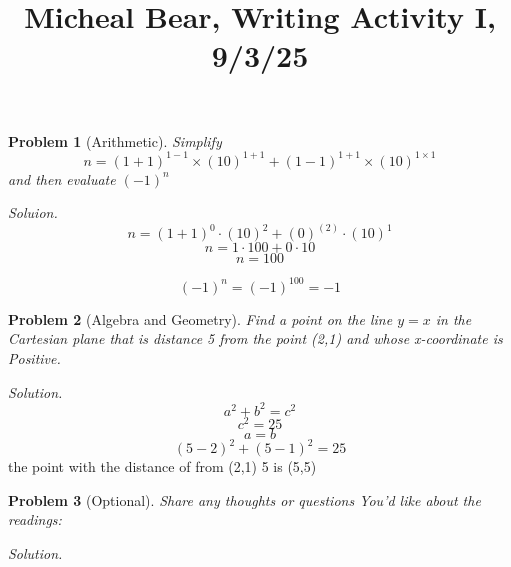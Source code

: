 \documentclass[11pt,twoside]{amsart}
\title {Micheal Bear, Writing Activity I, 9/3/25}
\newtheorem{prob}{Problem}
\begin{document}
\maketitle	
\begin{prob} [Arithmetic] Simplify 
$$n=(1+1)^{1-1} \times (10)^{1+1}+(1-1)^{1+1} \times (10)^{1\times1}$$ 
and then evaluate $(-1)^n$

\end {prob}

\emph{Soluion. }
	$$n = (1+1)^0 \cdot (10)^2 + (0)^(2) \cdot (10)^{1}$$
	$$n = 1\cdot 100 + 0 \cdot 10$$
	$$n=100$$

	$$(-1)^n = (-1)^{100} = -1$$

		
\begin{prob} [Algebra and Geometry]  Find a point on the line $y=x$ in the Cartesian 
plane that is distance 5 from the point (2,1) and whose x-coordinate is Positive. 
\end{prob}
 \emph{Solution. }
  $$ a^2 + b^2 = c^2 $$
 $$ c^2 = 25$$
$$ a = b $$
$$(5-2)^2 + (5-1)^2 = 25$$
the point with the distance of from (2,1) 5 is (5,5)





\begin{prob} [Optional] Share any thoughts or questions You'd like about the readings: 
   
\end{prob} 
\emph{Solution. }
\end{document}
